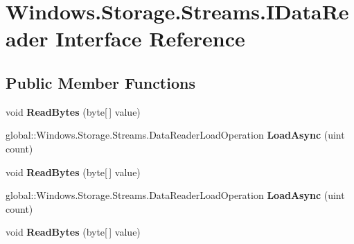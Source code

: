 \hypertarget{interface_windows_1_1_storage_1_1_streams_1_1_i_data_reader}{}\section{Windows.\+Storage.\+Streams.\+I\+Data\+Reader Interface Reference}
\label{interface_windows_1_1_storage_1_1_streams_1_1_i_data_reader}
\subsection*{Public Member Functions}
\begin{DoxyCompactItemize}
\item 
\mbox{\label{interface_windows_1_1_storage_1_1_streams_1_1_i_data_reader_aa8d3357fa7e015528178edd08636be86}} 
void {\bfseries Read\+Bytes} (byte\mbox{[}$\,$\mbox{]} value)
\item 
\mbox{\label{interface_windows_1_1_storage_1_1_streams_1_1_i_data_reader_a8588ac09a57e03e1696d0707335bcb2b}} 
global\+::\+Windows.\+Storage.\+Streams.\+Data\+Reader\+Load\+Operation {\bfseries Load\+Async} (uint count)
\item 
\mbox{\label{interface_windows_1_1_storage_1_1_streams_1_1_i_data_reader_aa8d3357fa7e015528178edd08636be86}} 
void {\bfseries Read\+Bytes} (byte\mbox{[}$\,$\mbox{]} value)
\item 
\mbox{\label{interface_windows_1_1_storage_1_1_streams_1_1_i_data_reader_a8588ac09a57e03e1696d0707335bcb2b}} 
global\+::\+Windows.\+Storage.\+Streams.\+Data\+Reader\+Load\+Operation {\bfseries Load\+Async} (uint count)
\item 
\mbox{\label{interface_windows_1_1_storage_1_1_streams_1_1_i_data_reader_aa8d3357fa7e015528178edd08636be86}} 
void {\bfseries Read\+Bytes} (byte\mbox{[}$\,$\mbox{]} value)
\item 
\mbox{\label{interface_windows_1_1_storage_1_1_streams_1_1_i_data_reader_a8588ac09a57e03e1696d0707335bcb2b}} 

\end{DoxyCompactItemize}
